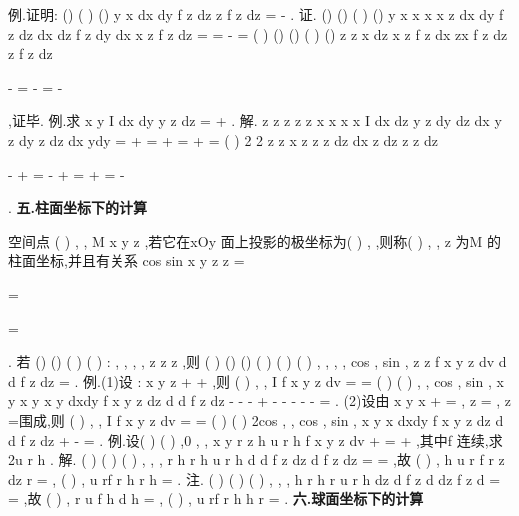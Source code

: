 \textcolor{lyred}{例}.证明:
()
(
)
()
y
x
dx dy
f z dz
z
f z dz
=
-
\int \int \int 
\int 
. 
证.
()
()
(
)
()
y
x
x
x
x
z
dx dy
f z dz
dx dz
f z dy
dx
x
z f z dz
=
=
-
=
\int \int \int 
\int \int \int 
\int \int 
(
)
()
()
(
)
()
z
z
x
dz
x
z f z dx
zx
f z dz
z
f z dz


-
=
-
=
-




\int \int 
\int 
\int 
,证毕. 
\textcolor{lyred}{例}.求
x
y
I
dx dy y
z dz
=
+
\int \int \int 
. 
解.
z
z
z
z
z
x
x
x
x
I
dx dz y
z dy
dz dx y
z dy
z dz dx ydy
=
+
=
+
=
+
=
\int \int \int 
\int \int \int 
\int 
\int \int 
(
)
2 2
z z
x
z
z
z dz
dx
z dz
z
z dz


-
+
=
-
+
=
+
=
-




\int 
\int 
\int 
\int 
. 
\vspace{4pt}
{\bfseries \textcolor{lyred}{五.柱面坐标下的计算}}

空间点
(
)
, ,
M x y z ,若它在xOy 面上投影的极坐标为(
)
,
\theta \rho ,则称(
)
,
, z
\theta \rho 
为M 的 
\textcolor{lyred}{柱面坐标},并且有关系
cos
sin
x
y
z
z
\rho 
\theta 
\rho 
\theta 
=


=

=

. 
若
()
()
(
)
(
)
:
,
,
,
,
z
z
z
\alpha 
\theta 
\beta \rho \theta 
\rho 
\rho 
\theta 
\theta \rho 
\theta \rho 
\Omega 
\le 
\le 
\le 
\le 
\le 
\le 
,则 
(
)
()
()
(
)
(
)
(
)
,
,
, ,
cos ,
sin ,
z
z
f x y z dv
d
d
f
z dz
\rho 
\theta 
\theta \rho 
\beta 
\alpha 
\rho \theta 
\theta \rho 
\theta 
\rho \rho 
\rho 
\theta \rho 
\theta 
\Omega 
=
\int \int \int 
\int 
\int 
\int 
. 
\textcolor{lyred}{例}.(1)设
:
x
y
z
\Omega 
+
+
\le ,则
(
)
, ,
I
f x y z dv
\Omega 
=
=
\int \int \int 
(
)
(
)
, ,
cos ,
sin ,
x
y
x
y
x
y
dxdy
f x y z dz
d
d
f
z dz
\rho 
\pi 
\rho 
\theta \rho \rho 
\rho 
\theta \rho 
\theta 
-
-
-
+
\le 
-
-
-
-
-
=
\int \int 
\int 
\int 
\int 
\int 
. 
(2)设\Omega 由
x
y
x
+
=
,
z =
,
z =围成,则
(
)
, ,
I
f x y z dv
\Omega 
=
=
\int \int \int 
(
)
(
)
2cos
, ,
cos ,
sin ,
x
y
x
dxdy
f x y z dz
d
d
f
z dz
\pi 
\theta 
\pi 
\theta 
\rho \rho 
\rho 
\theta \rho 
\theta 
+
\le 
-
=
\int \int 
\int 
\int 
\int 
\int 
. 
\textcolor{lyred}{例}.设(
)
(
)
,0
,
,
x
y
r
z h
u r h
f
x
y
z dv
+
\le 
\le \le 
=
+
\int \int \int 
,其中f 连续,求
2u
r h
\partial 
\partial \partial . 
解. (
)
(
)
(
)
,
,
,
r
h
r
h
u r h
d
d
f
z dz
d
f
z dz
\pi 
\theta \rho \rho 
\rho 
\pi \rho \rho 
\rho 
=
=
\int 
\int 
\int 
\int 
\int 
,故 
(
)
,
h
u
r
f r z dz
r
\pi 
\partial 
=
\partial 
\int 
,
(
)
,
u
rf r h
r h
\pi 
\partial 
=
\partial \partial 
. 
\textcolor{lyred}{注}. (
)
(
)
(
)
,
,
,
h
r
h
r
u r h
dz
d
f
z
d
dz
f
z
d
\pi 
\theta 
\rho 
\rho \rho 
\pi 
\rho 
\rho \rho 
=
=
\int 
\int 
\int 
\int \int 
,故 
(
)
,
r
u
f
h
d
h
\pi 
\rho 
\rho \rho 
\partial 
=
\partial 
\int 
,
(
)
,
u
rf r h
h r
\pi 
\partial 
=
\partial \partial 
. 
\vspace{4pt}
{\bfseries \textcolor{lyred}{六.球面坐标下的计算}}

